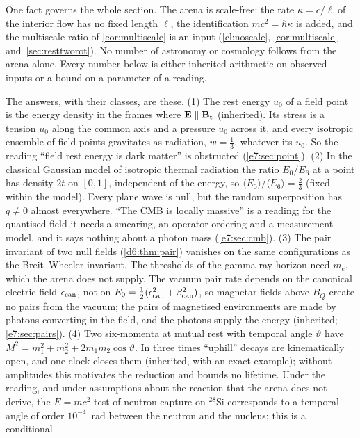 One fact governs the whole section. The arena is scale-free: the rate $\kappa=c/\ell$ of the interior flow has no fixed length $\ell$, the
identification $mc^2=\hbar\kappa$ is added, and the multiscale ratio of \cref{cor:multiscale} is an input (\cref{cl:noscale},
\cref{cor:multiscale} and~\cref{sec:resttworot}). No number of astronomy or cosmology follows from the arena alone. Every number below is either
inherited arithmetic on observed inputs or a bound on a parameter of a reading.

The answers, with their classes, are these. (1) The rest energy $u_0$ of a field point is the energy density in the frames where $\mathbf E\parallel\mathbf B_{\rm t}$
(inherited). Its stress is a tension $u_0$ along the common axis and a pressure $u_0$ across it, and every isotropic ensemble of field points
gravitates as radiation, $w=\tfrac13$, whatever its $u_0$. So the reading ``field rest energy is dark matter'' is obstructed
(\cref{e7:sec:point}). (2) In the classical Gaussian model of isotropic thermal radiation the ratio $E_0/E_6$ at a point has density $2t$ on
$[0,1]$, independent of the energy, so $\langle E_0\rangle/\langle E_6\rangle=\tfrac23$ (fixed within the model). Every plane wave is null, but the
random superposition has $q\neq0$ almost everywhere. ``The CMB is locally massive'' is a reading; for the quantised field it needs a smearing,
an operator ordering and a measurement model, and it says nothing about a photon mass (\cref{e7:sec:cmb}). (3) The pair invariant of two null fields (\cref{d6:thm:pair}) vanishes on the same configurations as the Breit--Wheeler invariant. The thresholds of the gamma-ray horizon need $m_e$,
which the arena does not supply. The vacuum pair rate depends on the canonical electric field $\epsilon_{\rm can}$, not on $E_0=\tfrac12(\epsilon_{\rm can}^2+\beta_{\rm can}^2)$,
so magnetar fields above $B_Q$ create no pairs from the vacuum; the pairs of magnetised environments are made by photons converting in the
field, and the photons supply the energy (inherited; \cref{e7:sec:pairs}). (4) Two six-momenta at mutual rest with temporal angle $\vartheta$
have $M^2=m_1^2+m_2^2+2m_1m_2\cos\vartheta$. In three times ``uphill'' decays are kinematically open, and one clock closes them (inherited, with
an exact example); without amplitudes this motivates the reduction and bounds no lifetime. Under the reading, and under assumptions about the reaction that the arena does not derive, the $E=mc^2$ test of neutron
capture on $^{28}$Si corresponds to a temporal angle of order $10^{-4}$~rad between the neutron and the nucleus; this is a conditional
